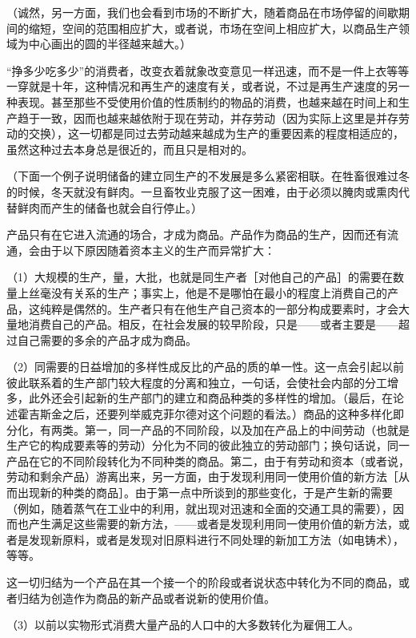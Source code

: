 （诚然，另一方面，我们也会看到市场的不断扩大，随着商品在市场停留的间歇期间的缩短，空间的范围相应扩大，或者说，市场在空间上相应扩大，以商品生产领域为中心画出的圆的半径越来越大。）

“挣多少吃多少”的消费者，改变衣着就象改变意见一样迅速，而不是一件上衣等等一穿就是十年，这种情况和再生产的速度有关，或者说，不过是再生产速度的另一种表现。甚至那些不受使用价值的性质制约的物品的消费，也越来越在时间上和生产趋于一致，因而也越来越依附于现在劳动，并存劳动（因为实际上这里是并存劳动的交换），这一切都是同过去劳动越来越成为生产的重要因素的程度相适应的，虽然这种过去本身总是很近的，而且只是相对的。

（下面一个例子说明储备的建立同生产的不发展是多么紧密相联。在牲畜很难过冬的时候，冬天就没有鲜肉。一旦畜牧业克服了这一困难，由于必须以腌肉或熏肉代替鲜肉而产生的储备也就会自行停止。）

产品只有在它进入流通的场合，才成为商品。产品作为商品的生产，因而还有流通，会由于以下原因随着资本主义的生产而异常扩大：

（1）大规模的生产，量，大批，也就是同生产者［对他自己的产品］的需要在数量上丝毫没有关系的生产；事实上，他是不是哪怕在最小的程度上消费自己的产品，这纯粹是偶然的。生产者只有在他生产自己资本的一部分构成要素时，才会大量地消费自己的产品。相反，在社会发展的较早阶段，只是——或者主要是——超过自己需要的多余的产品才成为商品。

（2）同需要的日益增加的多样性成反比的产品的质的单一性。这一点会引起以前彼此联系着的生产部门较大程度的分离和独立，一句话，会使社会内部的分工增多，此外还会引起新的生产部门的建立和商品种类的多样性的增加。（最后，在论述霍吉斯金之后，还要列举威克菲尔德对这个问题的看法。）商品的这种多样化即分化，有两类。第一，同一产品的不同阶段，以及加在产品上的中间劳动（也就是生产它的构成要素等的劳动）分化为不同的彼此独立的劳动部门；换句话说，同一产品在它的不同阶段转化为不同种类的商品。第二，由于有劳动和资本（或者说，劳动和剩余产品）游离出来，另一方面，由于发现利用同一使用价值的新方法［从而出现新的种类的商品］。由于第一点中所谈到的那些变化，于是产生新的需要（例如，随着蒸气在工业中的利用，就出现对迅速和全面的交通工具的需要），因而也产生满足这些需要的新方法，——或者是发现利用同一使用价值的新方法，或者是发现新原料，或者是发现对旧原料进行不同处理的新加工方法（如电铸术），等等。

这一切归结为一个产品在其一个接一个的阶段或者说状态中转化为不同的商品，或者归结为创造作为商品的新产品或者说新的使用价值。

（3）以前以实物形式消费大量产品的人口中的大多数转化为雇佣工人。

